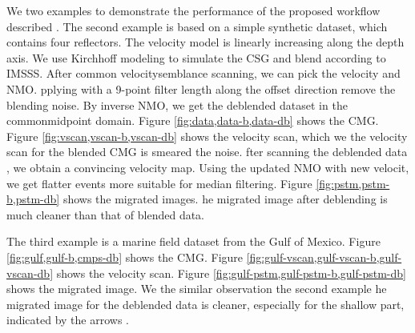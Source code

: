 We  two examples to demonstrate the performance of the proposed workflow described . 
The second example is based on a simple synthetic dataset, which contains four reflectors. The velocity  model is linearly increasing along the depth axis. We use Kirchhoff modeling to simulate the CSG and blend  according to IMSSS. After  common velocity\new{-}semblance scanning, we can pick the  velocity and  NMO. pplying   with a 9-point filter length along the offset direction remove the blending noise. By inverse NMO, we get the deblended dataset in the common\new{-}midpoint domain.  Figure \ref{fig:data,data-b,data-db} shows the  CMG. Figure \ref{fig:vscan,vscan-b,vscan-db} shows the  velocity scan,  which we  the velocity scan for the blended CMG is  smeared  the noise. fter scanning the  deblended data , we  obtain a convincing velocity map. Using the updated NMO with new velocit, we  get flatter events  more suitable for median filtering.  Figure \ref{fig:pstm,pstm-b,pstm-db} shows the  migrated images.  he migrated image after deblending is much cleaner than that of  blended data. 

The third example is a marine field dataset from the Gulf of Mexico. Figure \ref{fig:gulf,gulf-b,cmps-db} shows the  CMG. Figure \ref{fig:gulf-vscan,gulf-vscan-b,gulf-vscan-db} shows the  velocity scan. Figure \ref{fig:gulf-pstm,gulf-pstm-b,gulf-pstm-db} shows the   migrated image.  We  the similar observation   the second example\new{:} he migrated image for the deblended data is cleaner, especially for the shallow part, indicated by the arrows . 

